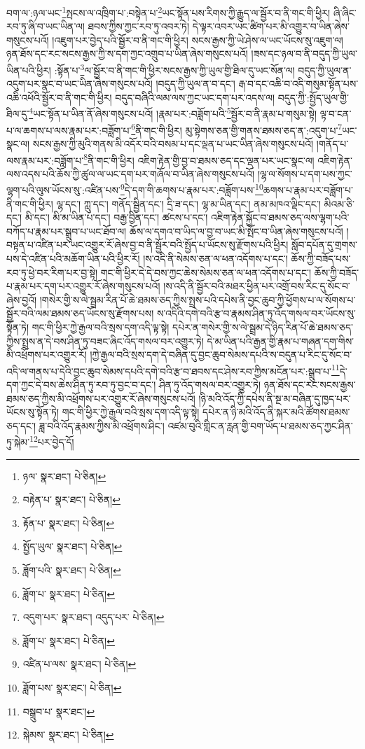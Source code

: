 བག་ལ་:ཉལ་ཡང་\footnote{ཉལ་  སྣར་ཐང་།  པེ་ཅིན། }སྤངས་ལ་འཁྲིག་པ་:བསྟེན་པ་\footnote{བརྟེན་པ་  སྣར་ཐང་།  པེ་ཅིན། }ཡང་སྟོན་པས་རིགས་ཀྱི་རྒྱུད་ལ་སྦྱོར་བ་ནི་གང་གི་ཕྱིར། ཞི་ཞིང་རབ་ཏུ་ཞི་བ་ཡང་ཡིན་ལ། ཐབས་ཀྱིས་ཀྱང་རབ་ཏུ་འབར་ཏེ། དེ་ལྟར་འབར་ཡང་ཚིག་པར་མི་འགྱུར་བ་ཡིན་ཞེས་གསུངས་པའོ། །འཇུག་པར་བྱེད་པའི་སྦྱོར་བ་ནི་གང་གི་ཕྱིར། སངས་རྒྱས་ཀྱི་ཡེ་ཤེས་ལ་ཡང་ཡོངས་སུ་འཇུག་ལ། ཉན་ཐོས་དང་རང་སངས་རྒྱས་ཀྱི་ས་དག་ཀྱང་འགྲུབ་པ་ཡིན་ཞེས་གསུངས་པའོ། །ཟས་དང་ཉལ་བ་ནི་བདུད་ཀྱི་ཡུལ་ཡིན་པའི་ཕྱིར། :སྟོན་པ་\footnote{རྟོན་པ་  སྣར་ཐང་།  པེ་ཅིན། }ལ་སྦྱོར་བ་ནི་གང་གི་ཕྱིར་སངས་རྒྱས་ཀྱི་ཡུལ་གྱི་ཐིལ་དུ་ཡང་སོན་ལ། བདུད་ཀྱི་ཡུལ་ན་འདུག་པར་སྣང་བ་ཡང་ཡིན་ཞེས་གསུངས་པའོ། །བདུད་ཀྱི་ཡུལ་ན་བ་དང་། རྒ་བ་དང་འཆི་བ་འདི་གསུམ་སྟོན་པས་འཆི་འཕོའི་སྦྱོར་བ་ནི་གང་གི་ཕྱིར། བདུད་བཞིའི་ལམ་ལས་ཀྱང་ཡང་དག་པར་འདས་ལ། བདུད་ཀྱི་:སྤྱོད་ཡུལ་གྱི་ཐིལ་དུ་\footnote{སྤྱོད་ཡུལ་  སྣར་ཐང་།  པེ་ཅིན། }ཡང་སྟོན་པ་ཡིན་ནོ་ཞེས་གསུངས་པའོ། །རྣམ་པར་:བཟློག་པའི་\footnote{ཟློག་པའི་  སྣར་ཐང་།  པེ་ཅིན། }སྦྱོར་བ་ནི་རྣམ་པ་གསུམ་སྟེ། ལྟ་བ་ངན་པ་ལ་ཆགས་པ་ལས་རྣམ་པར་:བཟློག་པ་\footnote{ཟློག་པ་  སྣར་ཐང་།  པེ་ཅིན། }ནི་གང་གི་ཕྱིར། མུ་སྟེགས་ཅན་གྱི་གནས་ཐམས་ཅད་ན་:འདུག་པ་\footnote{འདུག་པར་  སྣར་ཐང་། འདུད་པར་  པེ་ཅིན། }ཡང་སྣང་ལ། སངས་རྒྱས་ཀྱི་མུའི་གནས་མི་འདོར་བའི་བསམ་པ་དང་ལྡན་པ་ཡང་ཡིན་ཞེས་གསུངས་པའོ། །གནོད་པ་ལས་རྣམ་པར་:བཟློག་པ་\footnote{ཟློག་པ་  སྣར་ཐང་།  པེ་ཅིན། }ནི་གང་གི་ཕྱིར། འཇིག་རྟེན་གྱི་བྱ་བ་ཐམས་ཅད་དང་ལྡན་པར་ཡང་སྣང་ལ། འཇིག་རྟེན་ལས་འདས་པའི་ཆོས་ཀྱི་ཚུལ་ལ་ཡང་དག་པར་གཞོལ་བ་ཡིན་ཞེས་གསུངས་པའོ། །ལྷ་ལ་སོགས་པ་དག་པས་ཀྱང་ལྷག་པའི་ལུས་ཡོངས་སུ་:འཛིན་པས་\footnote{འཛིན་པ་ལས་  སྣར་ཐང་།  པེ་ཅིན། }དེ་དག་གི་ཆགས་པ་རྣམ་པར་:བཟློག་པས་\footnote{ཟློག་པས་  སྣར་ཐང་།  པེ་ཅིན། }ཆགས་པ་རྣམ་པར་བཟློག་པ་ནི་གང་གི་ཕྱིར། ལྷ་དང་། ཀླུ་དང་། གནོད་སྦྱིན་དང་། དྲི་ཟ་དང་། ལྷ་མ་ཡིན་དང་། ནམ་མཁའ་ལྡིང་དང་། མིའམ་ཅི་དང་། མི་དང་། མི་མ་ཡིན་པ་དང་། བརྒྱ་བྱིན་དང་། ཚངས་པ་དང་། འཇིག་རྟེན་སྐྱོང་བ་ཐམས་ཅད་ལས་ལྷག་པའི་བཀོད་པ་རྣམ་པར་སྒྲུབ་པ་ཡང་ཐོབ་ལ། ཆོས་ལ་དགའ་བ་ཡིད་ལ་བྱ་བ་ཡང་མི་སྤོང་བ་ཡིན་ཞེས་གསུངས་པའོ། །བསྟན་པ་འཛིན་པར་ཡང་འགྱུར་རོ་ཞེས་བྱ་བ་ནི་སྦྱོར་བའི་སྤྱོད་པ་ཡོངས་སུ་རྫོགས་པའི་ཕྱིར། སློབ་དཔོན་དུ་གྲགས་པས་དེ་འཛིན་པའི་མཆོག་ཡིན་པའི་ཕྱིར་རོ། །ས་འདི་ནི་སེམས་ཅན་ལ་ཕན་འདོགས་པ་དང་། ཆོས་ཀྱི་བཟོད་པས་རབ་ཏུ་ཕྱེ་བར་རིག་པར་བྱ་སྟེ། གང་གི་ཕྱིར་དེ་དེ་བས་ཀྱང་ཆེས་སེམས་ཅན་ལ་ཕན་འདོགས་པ་དང་། ཆོས་ཀྱི་བཟོད་པ་རྣམ་པར་དག་པར་འགྱུར་རོ་ཞེས་གསུངས་པའོ། །ས་འདི་ནི་སྦྱོར་བའི་མཐར་ཕྱིན་པར་འགྲོ་བས་རིང་དུ་སོང་བ་ཞེས་བྱའོ། །གསེར་གྱི་ས་ལེ་སྦྲམ་རིན་པོ་ཆེ་ཐམས་ཅད་ཀྱིས་སྤྲས་པའི་དཔེས་ནི་བྱང་ཆུབ་ཀྱི་ཕྱོགས་པ་ལ་སོགས་པ་སྦྱོར་བའི་ལམ་ཐམས་ཅད་ཡོངས་སུ་རྫོགས་པས། ས་འདིའི་དགེ་བའི་རྩ་བ་རྣམས་ཤིན་ཏུ་འོད་གསལ་བར་ཡོངས་སུ་སྟོན་ཏེ། གང་གི་ཕྱིར་ཀྱེ་རྒྱལ་བའི་སྲས་དག་འདི་ལྟ་སྟེ། དཔེར་ན་གསེར་གྱི་ས་ལེ་སྦྲམ་དེ་ཉིད་རིན་པོ་ཆེ་ཐམས་ཅད་ཀྱིས་སྤྲས་ན་དེ་བས་ཤིན་ཏུ་བཟང་ཞིང་འོད་གསལ་བར་འགྱུར་ཏེ། དེ་མ་ཡིན་པའི་རྒྱན་གྱི་རྣམ་པ་གཞན་དག་གིས་མི་འཕྲོགས་པར་འགྱུར་རོ། །ཀྱེ་རྒྱལ་བའི་སྲས་དག་དེ་བཞིན་དུ་བྱང་ཆུབ་སེམས་དཔའི་ས་བདུན་པ་རིང་དུ་སོང་བ་འདི་ལ་གནས་པ་དེའི་བྱང་ཆུབ་སེམས་དཔའི་དགེ་བའི་རྩ་བ་ཐབས་དང་ཤེས་རབ་ཀྱིས་མངོན་པར་:སྒྲུབ་པ་\footnote{བསྒྲུབ་པ་  སྣར་ཐང་། }དེ་དག་ཀྱང་དེ་བས་ཆེས་ཤིན་ཏུ་རབ་ཏུ་བྱང་བ་དང་། ཤིན་ཏུ་འོད་གསལ་བར་འགྱུར་ཏེ། ཉན་ཐོས་དང་རང་སངས་རྒྱས་ཐམས་ཅད་ཀྱིས་མི་འཕྲོགས་པར་འགྱུར་རོ་ཞེས་གསུངས་པའོ། །ཉི་མའི་འོད་ཀྱི་དཔེས་ནི་སྔ་མ་བཞིན་དུ་ཁྱད་པར་ཡོངས་སུ་སྟོན་ཏེ། གང་གི་ཕྱིར་ཀྱེ་རྒྱལ་བའི་སྲས་དག་འདི་ལྟ་སྟེ། དཔེར་ན་ཉི་མའི་འོད་ནི་སྐར་མའི་ཚོགས་ཐམས་ཅད་དང་། ཟླ་བའི་འོད་རྣམས་ཀྱིས་མི་འཕྲོགས་ཤིང་། འཛམ་བུའི་གླིང་ན་རླན་གྱི་བག་ཡོད་པ་ཐམས་ཅད་ཀྱང་ཤིན་ཏུ་སྐེམ་\footnote{སྐེམས་  སྣར་ཐང་།  པེ་ཅིན། }པར་བྱེད་དོ། 